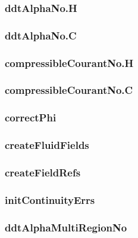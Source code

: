 \subsubsection*{ddtAlphaNo.H}

\subsubsection*{ddtAlphaNo.C}

\subsubsection*{compressibleCourantNo.H}

\subsubsection*{compressibleCourantNo.C}

\subsubsection*{correctPhi}

\subsubsection*{createFluidFields}

\subsubsection*{createFieldRefs}

\subsubsection*{initContinuityErrs}

\subsubsection*{ddtAlphaMultiRegionNo}


